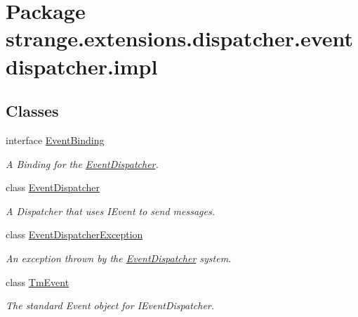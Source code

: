 \hypertarget{namespacestrange_1_1extensions_1_1dispatcher_1_1eventdispatcher_1_1impl}{\section{Package strange.\-extensions.\-dispatcher.\-eventdispatcher.\-impl}
\label{namespacestrange_1_1extensions_1_1dispatcher_1_1eventdispatcher_1_1impl}
}
\subsection*{Classes}
\begin{DoxyCompactItemize}
\item 
interface \hyperlink{classstrange_1_1extensions_1_1dispatcher_1_1eventdispatcher_1_1impl_1_1_event_binding}{Event\-Binding}
\begin{DoxyCompactList}\small\item\em A Binding for the \hyperlink{classstrange_1_1extensions_1_1dispatcher_1_1eventdispatcher_1_1impl_1_1_event_dispatcher}{Event\-Dispatcher}. \end{DoxyCompactList}\item 
class \hyperlink{classstrange_1_1extensions_1_1dispatcher_1_1eventdispatcher_1_1impl_1_1_event_dispatcher}{Event\-Dispatcher}
\begin{DoxyCompactList}\small\item\em A Dispatcher that uses I\-Event to send messages. \end{DoxyCompactList}\item 
class \hyperlink{classstrange_1_1extensions_1_1dispatcher_1_1eventdispatcher_1_1impl_1_1_event_dispatcher_exception}{Event\-Dispatcher\-Exception}
\begin{DoxyCompactList}\small\item\em An exception thrown by the \hyperlink{classstrange_1_1extensions_1_1dispatcher_1_1eventdispatcher_1_1impl_1_1_event_dispatcher}{Event\-Dispatcher} system. \end{DoxyCompactList}\item 
class \hyperlink{classstrange_1_1extensions_1_1dispatcher_1_1eventdispatcher_1_1impl_1_1_tm_event}{Tm\-Event}
\begin{DoxyCompactList}\small\item\em The standard Event object for I\-Event\-Dispatcher. \end{DoxyCompactList}\end{DoxyCompactItemize}
